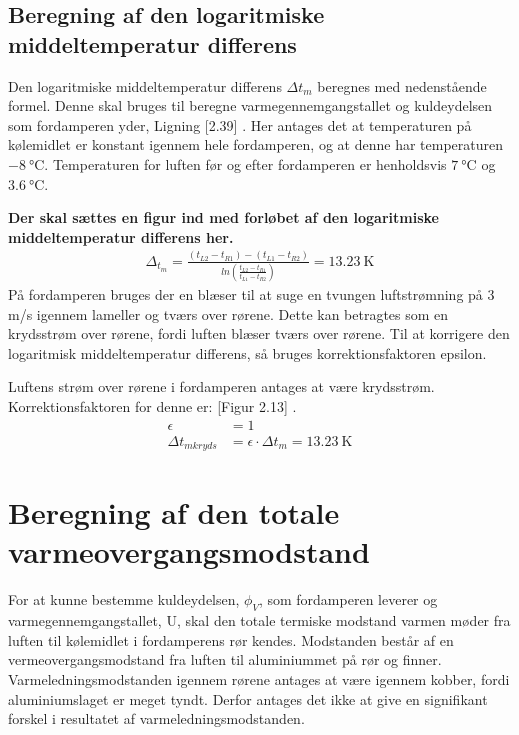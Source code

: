 \documentclass[../Hovedrapport.tex]{subfiles}
\begin{document}

\subsection{Beregning af den logaritmiske middeltemperatur differens}
    \label{sec:Massestrøm af kølemiddel}

Den logaritmiske middeltemperatur differens $\si{\Delta{t_m}}$ beregnes med nedenstående formel. Denne skal bruges til beregne varmegennemgangstallet og kuldeydelsen som fordamperen yder, Ligning [2.39] \citep{koleteknik}. Her antages det at temperaturen på kølemidlet er konstant igennem hele fordamperen, og at denne har temperaturen $\SI{-8}{\celsius}$. Temperaturen for luften før og efter fordamperen er henholdsvis $\SI{7}{\celsius}$ og $\SI{3,6}{\celsius}$.

\textbf{Der skal sættes en figur ind med forløbet af den logaritmiske middeltemperatur differens her.}
\begin{align}
\Delta_{t_m} = \frac{(t_{L2}-t_{R1})-(t_{L1}-t_{R2})}{ln{ \left( \frac{t_{L2}-t_{R1}}{t_{L1}-t_{R2}} \right) }} = \SI{13,23}{\kelvin}
\end{align}
På fordamperen bruges der en blæser til at suge en tvungen luftstrømning på 3 m/s igennem lameller og tværs over rørene. Dette kan betragtes som en krydsstrøm over rørene, fordi luften blæser tværs over rørene. Til at korrigere den logaritmisk middeltemperatur differens, så bruges korrektionsfaktoren epsilon. 

Luftens strøm over rørene i fordamperen antages at være krydsstrøm. Korrektionsfaktoren for denne er: [Figur 2.13] \citep{koleteknik}.
\begin{align}
    \epsilon &= 1   \\
   \si{\Delta{t_{mkryds}}} &= \si{\epsilon}\cdot\si{\Delta{t_m}} = \SI{13,23}{\kelvin}
\end{align}



\section{Beregning af den totale varmeovergangsmodstand}
    \label{sec:Beregning af den totale varmeovergangsmodstand}

For at kunne bestemme kuldeydelsen, $\si{\phi_V}$, som fordamperen leverer og varmegennemgangstallet, U, skal den totale termiske modstand varmen møder fra luften til kølemidlet i fordamperens rør kendes. Modstanden består af en vermeovergangsmodstand fra luften til aluminiummet på rør og finner. Varmeledningsmodstanden igennem rørene antages at være igennem kobber, fordi aluminiumslaget er meget tyndt. Derfor antages det ikke at give en signifikant forskel i resultatet af varmeledningsmodstanden.
\end{document}
